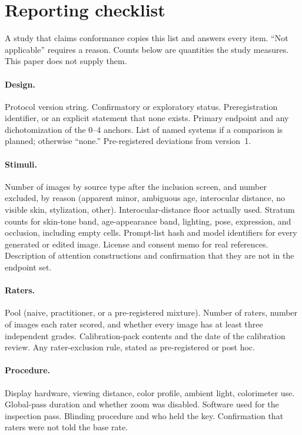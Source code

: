 \documentclass[10pt,twocolumn]{article}
\begin{document}
\appendix

\section{Reporting checklist}
\label{app:check}

A study that claims conformance copies this list and answers every item. ``Not applicable'' requires a reason. Counts below are quantities the study measures. This paper does not supply them.

\paragraph{Design.}
Protocol version string.
Confirmatory or exploratory status.
Preregistration identifier, or an explicit statement that none exists.
Primary endpoint and any dichotomization of the 0--4 anchors.
List of named systems if a comparison is planned; otherwise ``none.''
Pre-registered deviations from version~1.

\paragraph{Stimuli.}
Number of images by source type after the inclusion screen, and number excluded, by reason (apparent minor, ambiguous age, interocular distance, no visible skin, stylization, other).
Interocular-distance floor actually used.
Stratum counts for skin-tone band, age-appearance band, lighting, pose, expression, and occlusion, including empty cells.
Prompt-list hash and model identifiers for every generated or edited image.
License and consent memo for real references.
Description of attention constructions and confirmation that they are not in the endpoint set.

\paragraph{Raters.}
Pool (naive, practitioner, or a pre-registered mixture).
Number of raters, number of images each rater scored, and whether every image has at least three independent grades.
Calibration-pack contents and the date of the calibration review.
Any rater-exclusion rule, stated as pre-registered or post hoc.

\paragraph{Procedure.}
Display hardware, viewing distance, color profile, ambient light, colorimeter use.
Global-pass duration and whether zoom was disabled.
Software used for the inspection pass.
Blinding procedure and who held the key.
Confirmation that raters were not told the base rate.
\end{document}

